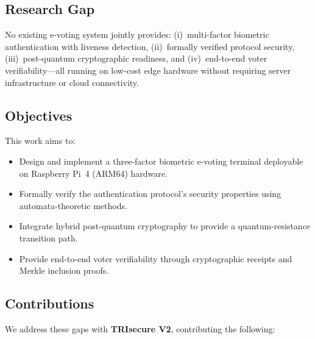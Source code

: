 \documentclass[pdflatex,sn-mathphys-num]{sn-jnl}%
\theoremstyle{thmstyleone}%
\theoremstyle{thmstyletwo}%
\theoremstyle{thmstylethree}%
\begin{document}
\subsection{Research Gap}

No existing e-voting system jointly provides: (i)~multi-factor biometric
authentication with liveness detection, (ii)~formally verified protocol
security, (iii)~post-quantum cryptographic readiness, and (iv)~end-to-end
voter verifiability—all running on low-cost edge hardware without requiring
server infrastructure or cloud connectivity.

\subsection{Objectives}

This work aims to:
\begin{itemize}
  \item Design and implement a three-factor biometric e-voting terminal
        deployable on Raspberry Pi~4 (ARM64) hardware.
  \item Formally verify the authentication protocol's security properties
        using automata-theoretic methods.
  \item Integrate hybrid post-quantum cryptography to provide a
        quantum-resistance transition path.
  \item Provide end-to-end voter verifiability through cryptographic
        receipts and Merkle inclusion proofs.
\end{itemize}

\subsection{Contributions}

We address these gaps with \textbf{TRIsecure V2}, contributing the following:
\end{document}
